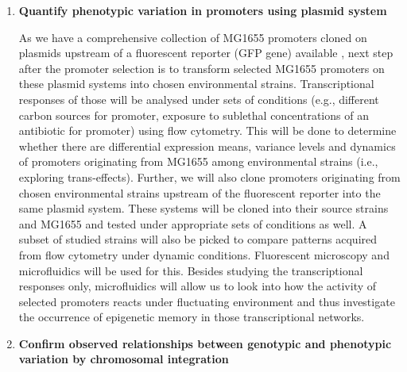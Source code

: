 \begin{enumerate}[font=\bfseries]
\begin{enumerate}[font=\bfseries]
        \item \textbf{Quantify phenotypic variation in promoters using plasmid system}
        
        As we have a comprehensive collection of MG1655 promoters cloned on plasmids upstream of a fluorescent reporter (GFP gene) available \cite{zaslaver2006comprehensive}, next step after the promoter selection is to transform selected MG1655 promoters on these plasmid systems into chosen environmental  strains.
        Transcriptional responses of those will be analysed under sets of conditions (e.g., different carbon sources for  promoter, exposure to sublethal concentrations of an antibiotic for  promoter) using flow cytometry.
        This will be done to determine whether there are differential expression means, variance levels and dynamics of promoters originating from MG1655 among environmental strains (i.e., exploring trans-effects).
        Further, we will also clone promoters originating from chosen environmental strains upstream of the fluorescent reporter into the same plasmid system.
        These  systems will be cloned into their source strains and MG1655 and tested under appropriate sets of conditions as well.
        A subset of studied strains will also be picked to compare patterns acquired from flow cytometry under dynamic conditions.
        Fluorescent microscopy and microfluidics will be used for this.
        Besides studying the transcriptional responses only, microfluidics will allow us to look into how the activity of selected promoters reacts under fluctuating environment and thus investigate the occurrence of epigenetic memory in those transcriptional networks.
        
        \item \textbf{Confirm observed relationships between genotypic and phenotypic variation by chromosomal integration}
        

\end{enumerate}
\end{enumerate}
